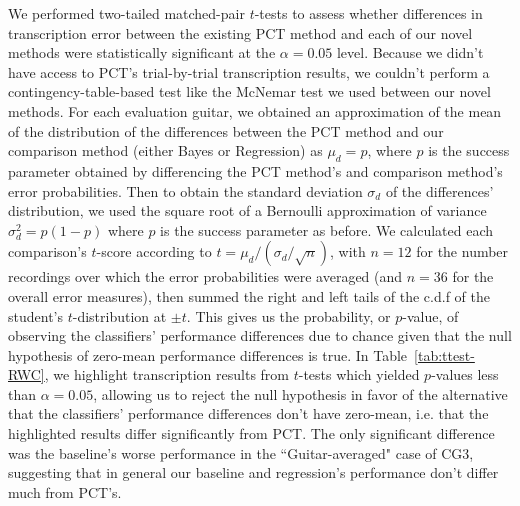 \documentclass[12pt]{cmuthesis}
\begin{document}
We performed two-tailed matched-pair $t$-tests to assess whether differences in transcription error between the existing PCT method and each of our novel methods were statistically significant at the $\alpha = 0.05$ level. Because we didn't have access to PCT's trial-by-trial transcription results, we couldn't perform a contingency-table-based test like the McNemar test we used between our novel methods. For each evaluation guitar, we obtained an approximation of the mean of the distribution of the differences between the PCT method and our comparison method (either Bayes or Regression) as $\mu_d = p$, where $p$ is the success parameter obtained by differencing the PCT method's and comparison method's error probabilities. Then to obtain the standard deviation $\sigma_d$ of the differences' distribution, we used the square root of a Bernoulli approximation of variance $\sigma^2_d = p(1-p)$ where $p$ is the success parameter as before. We calculated each comparison's $t$-score according to $t = \mu_d/(\sigma_d/\sqrt{n})$, with $n=12$ for the number recordings over which the error probabilities were averaged (and $n=36$ for the overall error measures), then summed the right and left tails of the c.d.f of the student's $t$-distribution at $\pm t$. This gives us the probability, or $p$-value, of observing the classifiers' performance differences due to chance given that the null hypothesis of zero-mean performance differences is true. In Table~\ref{tab:ttest-RWC}, we highlight transcription results from $t$-tests which yielded $p$-values less than $\alpha = 0.05$, allowing us to reject the null hypothesis in favor of the alternative that the classifiers' performance differences don't have zero-mean, i.e. that the highlighted results differ significantly from PCT. The only significant difference was the baseline's worse performance in the ``Guitar-averaged" case of CG3, suggesting that in general our baseline and regression's performance don't differ much from PCT's.
\end{document}

